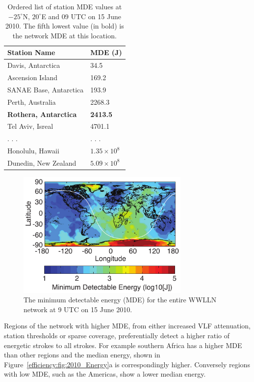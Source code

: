 \begin{table}[ht!]
\caption{Ordered list of station MDE values at $-25^\circ$N, $20^\circ$E and 09 UTC on 15 June 2010.
The fifth lowest value (in bold) is the network MDE at this location.}
\begin{center}
\begin{tabular}{p{2in}p{1in}}
\hline
Station Name 		& 	MDE (J)\\
\hline
\rule{0pt}{3ex}
Davis, Antarctica	&	34.5\\
Ascension Island	&	169.2\\
SANAE Base, Antarctica	&	193.9\\
Perth, Australia	&	2268.3\\
{\bf Rothera, Antarctica}	&	{\bf 2413.5}\\
Tel Aviv, Isreal	&	4701.1\\
. . .	&	. . .\\
Honolulu, Hawaii	&	$1.35 \times 10^8$\\
Dunedin, New Zealand	&	$5.09 \times 10^8$\\
\hline
\end{tabular}
\end{center}
\label{efficiency:table:mdeTable}
\end{table}

\begin{figure}[ht!]
   \centering
\noindent\includegraphics[width=20pc]{efficiency/Figures/2012RS005049-p4.pdf}
   \caption{The minimum detectable energy (MDE) for the entire WWLLN network at 9 UTC on 15 June 2010.}
   \label{efficiency:fig:Minimum_Energy}
\end{figure}

Regions of the network with higher MDE, from either increased VLF attenuation, station thresholds or sparse coverage, preferentially detect a higher ratio of energetic strokes to all strokes.
For example southern Africa has a higher MDE than other regions and the median energy, shown in Figure~\ref{efficiency:fig:2010_Energy}a is correspondingly higher.
Conversely regions with low MDE, such as the Americas, show a lower median energy.


